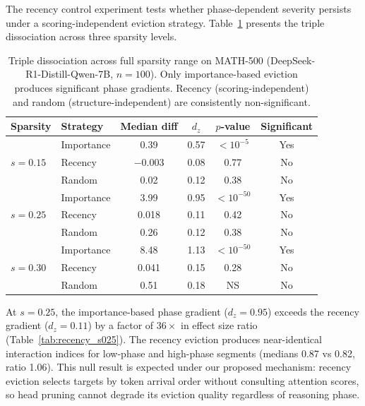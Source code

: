 \documentclass[11pt,a4paper]{article}
\begin{document}
The recency control experiment tests whether phase-dependent severity persists under a scoring-independent eviction strategy. Table~\ref{tab:triple_dissociation} presents the triple dissociation across three sparsity levels.

\begin{table}[t]
\centering
\caption{Triple dissociation across full sparsity range on MATH-500 (DeepSeek-R1-Distill-Qwen-7B, $n=100$). Only importance-based eviction produces significant phase gradients. Recency (scoring-independent) and random (structure-independent) are consistently non-significant.}
\label{tab:triple_dissociation}
\begin{tabular}{llcccc}
\toprule
Sparsity & Strategy & Median diff & $d_z$ & $p$-value & Significant \\
\midrule
\multirow{3}{*}{$s=0.15$} & Importance & 0.39 & 0.57 & $<10^{-5}$ & Yes \\
 & Recency & $-$0.003 & 0.08 & 0.77 & No \\
 & Random & 0.02 & 0.12 & 0.38 & No \\
\midrule
\multirow{3}{*}{$s=0.25$} & Importance & 3.99 & 0.95 & $<10^{-50}$ & Yes \\
 & Recency & 0.018 & 0.11 & 0.42 & No \\
 & Random & 0.26 & 0.12 & 0.38 & No \\
\midrule
\multirow{3}{*}{$s=0.30$} & Importance & 8.48 & 1.13 & $<10^{-50}$ & Yes \\
 & Recency & 0.041 & 0.15 & 0.28 & No \\
 & Random & 0.51 & 0.18 & NS & No \\
\bottomrule
\end{tabular}
\end{table}

At $s=0.25$, the importance-based phase gradient ($d_z = 0.95$) exceeds the recency gradient ($d_z = 0.11$) by a factor of $36\times$ in effect size ratio (Table~\ref{tab:recency_s025}). The recency eviction produces near-identical interaction indices for low-phase and high-phase segments (medians 0.87 vs 0.82, ratio 1.06). This null result is expected under our proposed mechanism: recency eviction selects targets by token arrival order without consulting attention scores, so head pruning cannot degrade its eviction quality regardless of reasoning phase.
\end{document}

